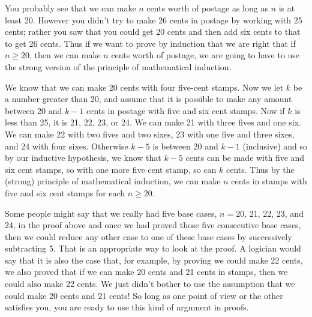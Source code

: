 \documentclass[10pt,]{book}
\theoremstyle{plain}
\theoremstyle{definition}
\numberwithin{equation}{chapter}
\begin{document}
You probably see that we can make \(n\) cents worth of postage as long as \(n\) is at least 20. However you didn't try to make 26 cents in postage by working with 25 cents; rather you saw that you could get 20 cents and then add six cents to that to get 26 cents. Thus if we want to prove by induction that we are right that if \(n\ge 20\), then we can make \(n\) cents worth of postage, we are going to have to use the strong version of the principle of mathematical induction.%
\par
We know that we can make 20 cents with four five-cent stamps. Now we let \(k\) be a number greater than 20, and assume that it is possible to make any amount between 20 and \(k-1\) cents in postage with five and six cent stamps. Now if \(k\) is less than 25, it is 21, 22, 23, or 24. We can make 21 with three fives and one six. We can make 22 with two fives and two sixes, 23 with one five and three sixes, and 24 with four sixes. Otherwise \(k-5\) is between 20 and \(k-1\) (inclusive) and so by our inductive hypothesis, we know that \(k-5\) cents can be made with five and six cent stamps, so with one more five cent stamp, so can \(k\) cents. Thus by the (strong) principle of mathematical induction, we can make \(n\) cents in stamps with five and six cent stamps for each \(n\ge 20\).%
\par
Some people might say that we really had five base cases, \(n=20\), 21, 22, 23, and 24, in the proof above and once we had proved those five consecutive base cases, then we could reduce any other case to one of these base cases by successively subtracting 5. That is an appropriate way to look at the proof. A logician would say that it is also the case that, for example, by proving we could make 22 cents, we also proved that if we can make 20 cents and 21 cents in stamps, then we could also make 22 cents. We just didn't bother to use the assumption that we could make 20 cents and 21 cents! So long as one point of view or the other satisfies you, you are ready to use this kind of argument in proofs. \leavevmode%
\end{document}
